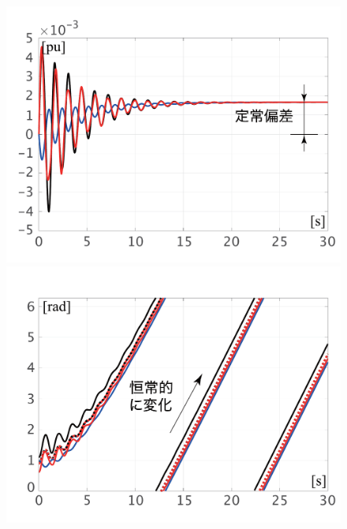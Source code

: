 \documentclass[graybox, envcountchap]{svmult}
\begin{document}
\begin{figure}[t]
  \centering
  {
  \begin{minipage}{0.49\linewidth}
    \centering
    \includegraphics[width = 1.0\linewidth]{figs/DomegaP}
    \medskip
  \end{minipage}
  \begin{minipage}{0.49\linewidth}
    \centering
    \includegraphics[width = 1.0\linewidth]{figs/delangVP}
    \medskip
  \end{minipage}
 \begin{minipage}{0.49\linewidth}
    \centering

\end{minipage}}
\end{figure}
\end{document}
